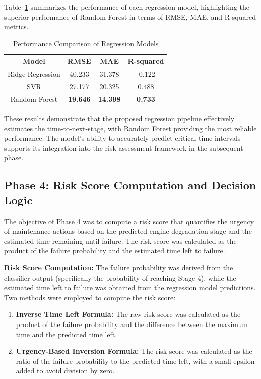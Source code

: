 \documentclass[conference]{IEEEtran}
\begin{document}
Table~\ref{tab:regression_comparison} summarizes the performance of each regression model, highlighting the superior performance of Random Forest in terms of RMSE, MAE, and R-squared metrics.

\begin{table}[h]
    \centering
    \caption{Performance Comparison of Regression Models}
    \begin{tabular}{|c|c|c|c|}
        \hline
        \textbf{Model} & \textbf{RMSE} & \textbf{MAE} & \textbf{R-squared} \\
        \hline
        Ridge Regression & 40.233 & 31.378 & -0.122 \\
        SVR & \underline{27.177} & \underline{20.325} & \underline{0.488} \\
        Random Forest & \textbf{19.646} & \textbf{14.398} & \textbf{0.733} \\
        \hline
    \end{tabular}
    \label{tab:regression_comparison}
\end{table}

These results demonstrate that the proposed regression pipeline effectively estimates the time-to-next-stage, with Random Forest providing the most reliable performance. The model’s ability to accurately predict critical time intervals supports its integration into the risk assessment framework in the subsequent phase.


\subsection{Phase 4: Risk Score Computation and Decision Logic}

The objective of Phase 4 was to compute a risk score that quantifies the urgency of maintenance actions based on the predicted engine degradation stage and the estimated time remaining until failure. The risk score was calculated as the product of the failure probability and the estimated time left to failure. 

\textbf{Risk Score Computation:} The failure probability was derived from the classifier output (specifically the probability of reaching Stage 4), while the estimated time left to failure was obtained from the regression model predictions. Two methods were employed to compute the risk score:
\begin{enumerate}
    \item \textbf{Inverse Time Left Formula:} The raw risk score was calculated as the product of the failure probability and the difference between the maximum time and the predicted time left.
    \item \textbf{Urgency-Based Inversion Formula:} The risk score was calculated as the ratio of the failure probability to the predicted time left, with a small epsilon added to avoid division by zero.
\end{enumerate}
\end{document}
